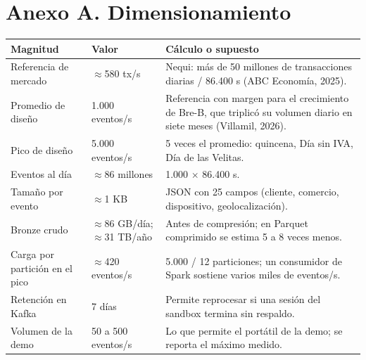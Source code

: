 \documentclass[12pt,letterpaper]{article}
\begin{document}
\section*{Anexo A. Dimensionamiento}
\begin{footnotesize}
\begin{tabular}{@{}P{2.1in}P{1.3in}P{2.9in}@{}}
\toprule
\textbf{Magnitud} & \textbf{Valor} & \textbf{Cálculo o supuesto}\\
\midrule
Referencia de mercado & $\approx$580 tx/s & Nequi: más de 50 millones de transacciones diarias / 86.400 s (ABC Economía, 2025).\\
Promedio de diseño & 1.000 eventos/s & Referencia con margen para el crecimiento de Bre-B, que triplicó su volumen diario en siete meses (Villamil, 2026).\\
Pico de diseño & 5.000 eventos/s & 5 veces el promedio: quincena, Día sin IVA, Día de las Velitas.\\
Eventos al día & $\approx$86 millones & 1.000 $\times$ 86.400 s.\\
Tamaño por evento & $\approx$1 KB & JSON con 25 campos (cliente, comercio, dispositivo, geolocalización).\\
Bronze crudo & $\approx$86 GB/día; $\approx$31 TB/año & Antes de compresión; en Parquet comprimido se estima 5 a 8 veces menos.\\
Carga por partición en el pico & $\approx$420 eventos/s & 5.000 / 12 particiones; un consumidor de Spark sostiene varios miles de eventos/s.\\
Retención en Kafka & 7 días & Permite reprocesar si una sesión del sandbox termina sin respaldo.\\
Volumen de la demo & 50 a 500 eventos/s & Lo que permite el portátil de la demo; se reporta el máximo medido.\\
\bottomrule
\end{tabular}
\end{footnotesize}
\end{document}
